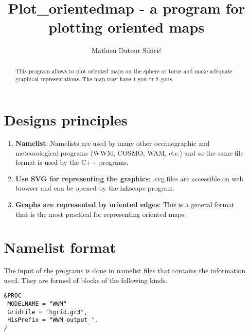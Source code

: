 \documentclass[12pt]{amsart}
\begin{document}
\author{Mathieu Dutour Sikiri\'c}
\address{Mathieu Dutour Sikiri\'c, Rudjer Boskovi\'c Institute, Bijenicka 54, 10000 Zagreb, Croatia, Fax: +385-1-468-0245}







\title{Plot\_orientedmap - a program for plotting oriented maps}


\maketitle

\begin{abstract}
  This program allows to plot oriented maps on the sphere or torus and make adequate graphical representations.
  The map may have $1$-gon or $2$-gons. 
\end{abstract}

\section{Designs principles}



\begin{enumerate}
\item {\bf Namelist}: Namelists are used by many other oceanographic and meteorological programs (WWM, COSMO, WAM, etc.) and so the same file format is used by the C++ programs.
\item {\bf Use SVG for representing the graphics}: .svg files are accessible on web browser and can be opened by the inkscape program.
\item {\bf Graphs are represented by oriented edges}: This is a general format that is the most practical for representing oriented maps
\end{enumerate}



\section{Namelist format}

The input of the programs is done in namelist files that contains the information used.
They are formed of blocks of the following kinds.

\begin{verbatim}
&PROC
 MODELNAME = "WWM"
 GridFile = "hgrid.gr3",
 HisPrefix = "WWM_output_",
/
\end{verbatim}
\end{document}
